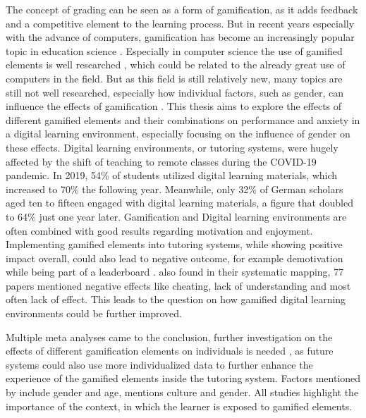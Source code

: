 The concept of grading can be seen as a form of gamification, as it adds feedback and a competitive element to the learning process.
But in recent years especially with the advance of computers, gamification has become an increasingly popular topic in education science \parencite{swachaStateResearchGamification2021}.
Especially in computer science the use of gamified elements is well researched \parencite{dichevGamifyingEducationWhat2017}, which could be related to the already great use of computers in the field.
But as this field is still relatively new, many topics are still not well researched, especially how individual factors, such as gender, can influence the effects of gamification \parencite{dehghanzadehUsingGamificationSupport2024,oliveiraTailoredGamificationEducation2023}.
This thesis aims to explore the effects of different gamified elements and their combinations on performance and anxiety in a digital learning environment, especially focusing on the influence of gender on these effects.
Digital learning environments, or tutoring systems, were hugely affected by the shift of teaching to remote classes during the COVID-19 pandemic.
In 2019, 54\% of students utilized digital learning materials, which increased to 70\% the following year. Meanwhile, only 32\% of German scholars aged ten to fifteen engaged with digital learning materials, a figure that doubled to 64\% just one year later.
Gamification and Digital learning environments are often combined \parencite{gonzalezGamificationIntelligentTutoring2014} with good results \parencite{jacksonMotivationPerformanceGamebased2013} regarding motivation and enjoyment.
Implementing gamified elements into tutoring systems, while showing positive impact overall, could also lead to negative outcome, for example demotivation while being part of a leaderboard \parencite{almeidaSystematicMappingNegative2021}.
\textcite{almeidaSystematicMappingNegative2021} also found in their systematic mapping, 77 papers mentioned negative effects like cheating, lack of understanding and most often lack of effect.
This leads to the question on how gamified digital learning environments could be further improved.

Multiple meta analyses came to the conclusion, further investigation on the effects of different gamification elements on individuals is needed \textcite{oliveiraTailoredGamificationEducation2023,dehghanzadehUsingGamificationSupport2024,hamariDoesGamificationWork2014}, as future systems could also use more individualized data to further enhance the experience of the gamified elements inside the tutoring system.
Factors mentioned by \textcite{dehghanzadehUsingGamificationSupport2024} include gender and age, \textcite{oliveiraTailoredGamificationEducation2023} mentions culture and gender. All studies highlight the importance of the context, in which the learner is exposed to gamified elements.

